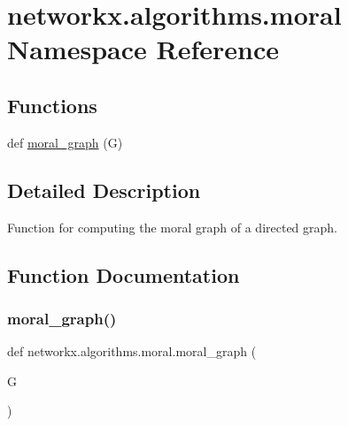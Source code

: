 \hypertarget{namespacenetworkx_1_1algorithms_1_1moral}{}\section{networkx.\+algorithms.\+moral Namespace Reference}
\label{namespacenetworkx_1_1algorithms_1_1moral}
\subsection*{Functions}
\begin{DoxyCompactItemize}
\item 
def \hyperlink{namespacenetworkx_1_1algorithms_1_1moral_a9fdebf06e31482e94af1241727b5e6d2}{moral\+\_\+graph} (G)
\end{DoxyCompactItemize}


\subsection{Detailed Description}
\begin{DoxyVerb}Function for computing the moral graph of a directed graph.\end{DoxyVerb}
 

\subsection{Function Documentation}
\mbox{\label{namespacenetworkx_1_1algorithms_1_1moral_a9fdebf06e31482e94af1241727b5e6d2}} 
\subsubsection{\texorpdfstring{moral\+\_\+graph()}{moral\_graph()}}
{\footnotesize\ttfamily def networkx.\+algorithms.\+moral.\+moral\+\_\+graph (\begin{DoxyParamCaption}\item[{}]{G }\end{DoxyParamCaption})}

